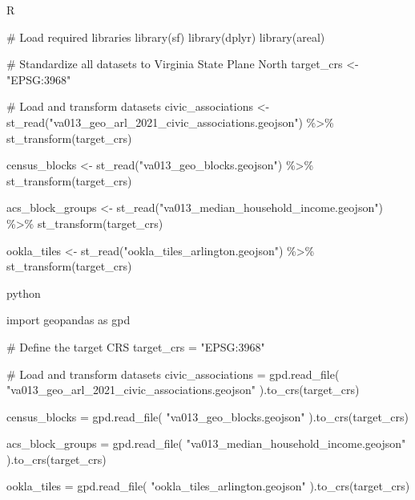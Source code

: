 \documentclass[
  letterpaper,
  DIV=11,
  numbers=noendperiod]{scrartcl}
\newenvironment{Shaded}{\begin{snugshade}}{\end{snugshade}}
\newcommand{\CommentTok}[1]{\textcolor[rgb]{0.37,0.37,0.37}{#1}}
\newcommand{\FunctionTok}[1]{\textcolor[rgb]{0.28,0.35,0.67}{#1}}
\newcommand{\ImportTok}[1]{\textcolor[rgb]{0.00,0.46,0.62}{#1}}
\newcommand{\NormalTok}[1]{\textcolor[rgb]{0.00,0.23,0.31}{#1}}
\newcommand{\OperatorTok}[1]{\textcolor[rgb]{0.37,0.37,0.37}{#1}}
\newcommand{\OtherTok}[1]{\textcolor[rgb]{0.00,0.23,0.31}{#1}}
\newcommand{\SpecialCharTok}[1]{\textcolor[rgb]{0.37,0.37,0.37}{#1}}
\newcommand{\StringTok}[1]{\textcolor[rgb]{0.13,0.47,0.30}{#1}}
\begin{document}
R

\begin{Shaded}
\begin{Highlighting}[]
\CommentTok{\# Load required libraries}
\FunctionTok{library}\NormalTok{(sf)}
\FunctionTok{library}\NormalTok{(dplyr)}
\FunctionTok{library}\NormalTok{(areal)}

\CommentTok{\# Standardize all datasets to Virginia State Plane North}
\NormalTok{target\_crs }\OtherTok{\textless{}{-}} \StringTok{"EPSG:3968"}

\CommentTok{\# Load and transform datasets}
\NormalTok{civic\_associations }\OtherTok{\textless{}{-}}
  \FunctionTok{st\_read}\NormalTok{(}\StringTok{"va013\_geo\_arl\_2021\_civic\_associations.geojson"}\NormalTok{) }\SpecialCharTok{\%\textgreater{}\%}
  \FunctionTok{st\_transform}\NormalTok{(target\_crs)}

\NormalTok{census\_blocks }\OtherTok{\textless{}{-}} \FunctionTok{st\_read}\NormalTok{(}\StringTok{"va013\_geo\_blocks.geojson"}\NormalTok{) }\SpecialCharTok{\%\textgreater{}\%}
  \FunctionTok{st\_transform}\NormalTok{(target\_crs)}

\NormalTok{acs\_block\_groups }\OtherTok{\textless{}{-}} \FunctionTok{st\_read}\NormalTok{(}\StringTok{"va013\_median\_household\_income.geojson"}\NormalTok{) }\SpecialCharTok{\%\textgreater{}\%}
  \FunctionTok{st\_transform}\NormalTok{(target\_crs)}

\NormalTok{ookla\_tiles }\OtherTok{\textless{}{-}} \FunctionTok{st\_read}\NormalTok{(}\StringTok{"ookla\_tiles\_arlington.geojson"}\NormalTok{) }\SpecialCharTok{\%\textgreater{}\%}
  \FunctionTok{st\_transform}\NormalTok{(target\_crs)}
\end{Highlighting}
\end{Shaded}

python

\begin{Shaded}
\begin{Highlighting}[]
\ImportTok{import}\NormalTok{ geopandas }\ImportTok{as}\NormalTok{ gpd}

\CommentTok{\# Define the target CRS}
\NormalTok{target\_crs }\OperatorTok{=} \StringTok{"EPSG:3968"}

\CommentTok{\# Load and transform datasets}
\NormalTok{civic\_associations }\OperatorTok{=}\NormalTok{ gpd.read\_file(}
    \StringTok{"va013\_geo\_arl\_2021\_civic\_associations.geojson"}
\NormalTok{).to\_crs(target\_crs)}

\NormalTok{census\_blocks }\OperatorTok{=}\NormalTok{ gpd.read\_file(}
    \StringTok{"va013\_geo\_blocks.geojson"}
\NormalTok{).to\_crs(target\_crs)}

\NormalTok{acs\_block\_groups }\OperatorTok{=}\NormalTok{ gpd.read\_file(}
    \StringTok{"va013\_median\_household\_income.geojson"}
\NormalTok{).to\_crs(target\_crs)}

\NormalTok{ookla\_tiles }\OperatorTok{=}\NormalTok{ gpd.read\_file(}
    \StringTok{"ookla\_tiles\_arlington.geojson"}
\NormalTok{).to\_crs(target\_crs)}
\end{Highlighting}
\end{Shaded}
\end{document}
